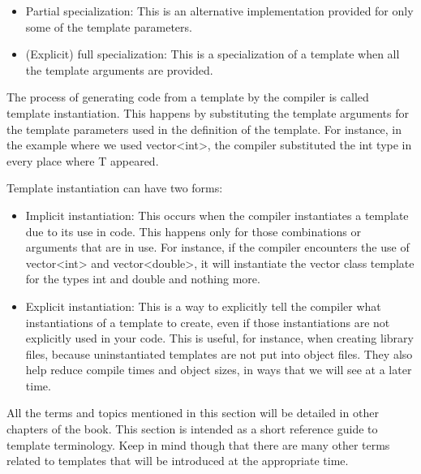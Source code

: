 \begin{itemize}
\item
Partial specialization: This is an alternative implementation provided for only some of the template parameters.

\item
(Explicit) full specialization: This is a specialization of a template when all the template arguments are provided.
\end{itemize}

The process of generating code from a template by the compiler is called template instantiation. This happens by substituting the template arguments for the template parameters used in the definition of the template. For instance, in the example where we used vector<int>, the compiler substituted the int type in every place where T appeared.

Template instantiation can have two forms:

\begin{itemize}
\item
Implicit instantiation: This occurs when the compiler instantiates a template due to its use in code. This happens only for those combinations or arguments that are in use. For instance, if the compiler encounters the use of vector<int> and vector<double>, it will instantiate the vector class template for the types int and double and nothing more.

\item
Explicit instantiation: This is a way to explicitly tell the compiler what instantiations of a template to create, even if those instantiations are not explicitly used in your code. This is useful, for instance, when creating library files, because uninstantiated templates are not put into object files. They also help reduce compile times and object sizes, in ways that we will see at a later time.
\end{itemize}

All the terms and topics mentioned in this section will be detailed in other chapters of the book. This section is intended as a short reference guide to template terminology. Keep in mind though that there are many other terms related to templates that will be introduced at the appropriate time.



